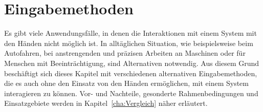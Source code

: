 \chapter{Eingabemethoden}
\label{cha:Eingabe}
Es gibt viele Anwendungsfälle, in denen die Interaktionen mit einem System mit den Händen nicht möglich ist. In alltäglichen Situation, wie beispielsweise beim Autofahren, bei anstrengenden und präzisen Arbeiten an Maschinen oder für Menschen mit Beeinträchtigung, sind Alternativen notwendig. Aus diesem Grund beschäftigt sich \mbox{dieses} Kapitel mit verschiedenen alternativen Eingabemethoden, die es auch ohne den Einsatz von den Händen ermöglichen, mit einem System interagieren zu können. Vor- und Nachteile, gesonderte Rahmenbedingungen und Einsatzgebiete werden in Kapitel~\ref{cha:Vergleich} \mbox{näher} erläutert.
